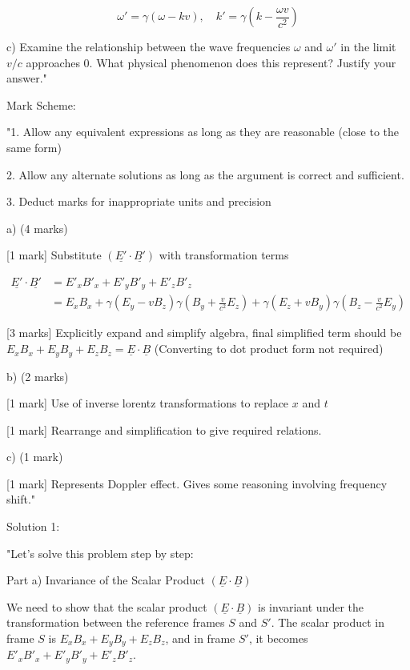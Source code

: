 \[ \omega' = \gamma(\omega - kv), \quad k' = \gamma(k - \frac{\omega v}{c^{2}}) \]

c) Examine the relationship between the wave frequencies \( \omega \) and \( \omega' \) in the limit \( v/c \) approaches \( 0 \). What physical phenomenon does this represent? Justify your answer."

Mark Scheme: 

"1. Allow any equivalent expressions as long as they are reasonable (close to the same form)

2. Allow any alternate solutions as long as the argument is correct and sufficient. 

3. Deduct marks for inappropriate units and precision

a) (4 marks)

[1 mark] Substitute \( (\underline{E'} \cdot \underline{B'}) \) with transformation terms

\begin{align*}
    \underline{E'} \cdot \underline{B'} & = E'_x B'_x + E'_y B'_y + E'_z B'_z \\ & = E_{x} B_{x} + \gamma(E_{y} - vB_{z}) \gamma(B_{y} + \frac{v}{c^{2}} E_{z}) + \gamma(E_{z} + vB_{y}) \gamma(B_{z} - \frac{v}{c^{2}} E_{y})
\end{align*}

[3 marks] Explicitly expand and simplify algebra, final simplified term should be \( E_x B_x + E_y B_y + E_z B_z = \underline{E} \cdot \underline{B} \) (Converting to dot product form not required)

b) (2 marks)

[1 mark] Use of inverse lorentz transformations to replace \( x \) and \( t \)

[1 mark] Rearrange and simplification to give required relations.

c) (1 mark)

[1 mark] Represents Doppler effect. Gives some reasoning involving frequency shift."

Solution 1: 

"Let's solve this problem step by step:

Part a) Invariance of the Scalar Product \( (\underline{E} \cdot \underline{B}) \)

We need to show that the scalar product \( (\underline{E} \cdot \underline{B}) \) is invariant under the transformation between the reference frames \( S \) and \( S' \). The scalar product in frame \( S \) is \( E_x B_x + E_y B_y + E_z B_z \), and in frame \( S' \), it becomes \( E'_x B'_x + E'_y B'_y + E'_z B'_z \).


